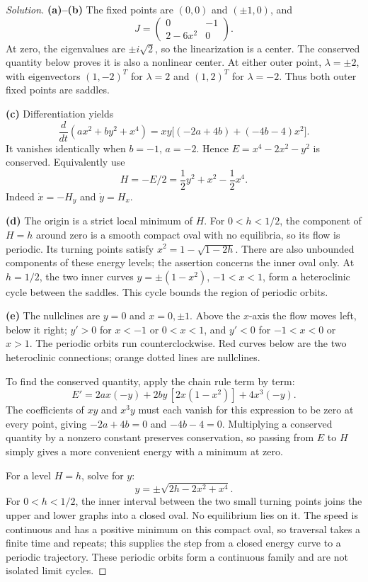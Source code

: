 \documentclass[10pt]{amsart}
\newenvironment{solution}
{\begin{proof}[Solution]}
{\end{proof}}
\begin{document}
\begin{enumerate}[label=\arabic*), leftmargin=*, itemsep=1em]
\begin{solution}
\textbf{(a)--(b)} The fixed points are $(0,0)$ and $(\pm1,0)$, and
\[
J=\begin{pmatrix}0&-1\\2-6x^2&0\end{pmatrix}.
\]
At zero, the eigenvalues are $\pm i\sqrt2$, so the linearization is a center. The conserved quantity below proves it is also a nonlinear center. At either outer point, $\lambda=\pm2$, with eigenvectors $(1,-2)^T$ for $\lambda=2$ and $(1,2)^T$ for $\lambda=-2$. Thus both outer fixed points are saddles.

\textbf{(c)} Differentiation yields
\[
\frac{d}{dt}(ax^2+by^2+x^4)
=xy\bigl[(-2a+4b)+(-4b-4)x^2\bigr].
\]
It vanishes identically when $b=-1$, $a=-2$. Hence $E=x^4-2x^2-y^2$ is conserved. Equivalently use
\[
H=-E/2=\frac12 y^2+x^2-\frac12x^4.
\]
Indeed $\dot{x}=-H_y$ and $\dot{y}=H_x$.

\textbf{(d)} The origin is a strict local minimum of $H$. For $0<h<1/2$, the component of $H=h$ around zero is a smooth compact oval with no equilibria, so its flow is periodic. Its turning points satisfy $x^2=1-\sqrt{1-2h}$. There are also unbounded components of these energy levels; the assertion concerns the inner oval only. At $h=1/2$, the two inner curves $y=\pm(1-x^2)$, $-1<x<1$, form a heteroclinic cycle between the saddles. This cycle bounds the region of periodic orbits.

\textbf{(e)} The nullclines are $y=0$ and $x=0,\pm1$. Above the $x$-axis the flow moves left, below it right; $y'>0$ for $x<-1$ or $0<x<1$, and $y'<0$ for $-1<x<0$ or $x>1$. The periodic orbits run counterclockwise. Red curves below are the two heteroclinic connections; orange dotted lines are nullclines.

To find the conserved quantity, apply the chain rule term by term:
\[
E'=2ax(-y)+2by\,[2x(1-x^2)]+4x^3(-y).
\]
The coefficients of $xy$ and $x^3y$ must each vanish for this expression to be zero at every point, giving $-2a+4b=0$ and $-4b-4=0$. Multiplying a conserved quantity by a nonzero constant preserves conservation, so passing from $E$ to $H$ simply gives a more convenient energy with a minimum at zero.

For a level $H=h$, solve for $y$:
\[
y=\pm\sqrt{2h-2x^2+x^4}.
\]
For $0<h<1/2$, the inner interval between the two small turning points joins the upper and lower graphs into a closed oval. No equilibrium lies on it. The speed is continuous and has a positive minimum on this compact oval, so traversal takes a finite time and repeats; this supplies the step from a closed energy curve to a periodic trajectory. These periodic orbits form a continuous family and are not isolated limit cycles.


\end{solution}
\end{enumerate}
\end{document}

